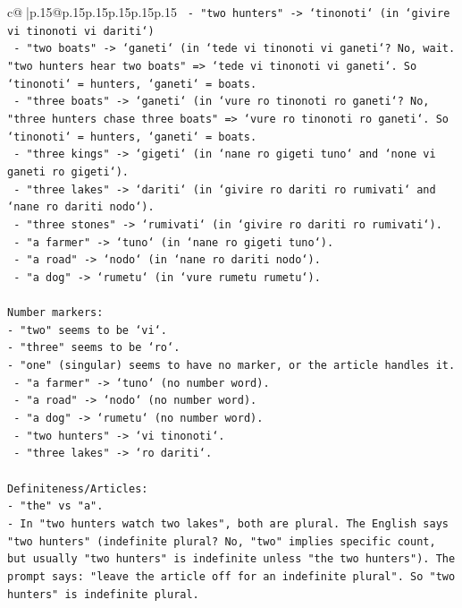 \documentclass{article}
\begin{document}
{\begin{supertabular}{c@{$\;$}|p{.15\linewidth}@{}p{.15\linewidth}p{.15\linewidth}p{.15\linewidth}p{.15\linewidth}p{.15\linewidth}}
{{{\texttt{  {-} "two hunters" {-}> `tinonoti` (in `givire vi tinonoti vi dariti`)} \\
\texttt{  {-} "two boats" {-}> `ganeti` (in `tede vi tinonoti vi ganeti`? No, wait. "two hunters hear two boats" => `tede vi tinonoti vi ganeti`. So `tinonoti` = hunters, `ganeti` = boats.} \\
\texttt{  {-} "three boats" {-}> `ganeti` (in `vure ro tinonoti ro ganeti`? No, "three hunters chase three boats" => `vure ro tinonoti ro ganeti`. So `tinonoti` = hunters, `ganeti` = boats.} \\
\texttt{  {-} "three kings" {-}> `gigeti` (in `nane ro gigeti tuno` and `none vi ganeti ro gigeti`).} \\
\texttt{  {-} "three lakes" {-}> `dariti` (in `givire ro dariti ro rumivati` and `nane ro dariti nodo`).} \\
\texttt{  {-} "three stones" {-}> `rumivati` (in `givire ro dariti ro rumivati`).} \\
\texttt{  {-} "a farmer" {-}> `tuno` (in `nane ro gigeti tuno`).} \\
\texttt{  {-} "a road" {-}> `nodo` (in `nane ro dariti nodo`).} \\
\texttt{  {-} "a dog" {-}> `rumetu` (in `vure rumetu rumetu`).} \\
\\ 
\texttt{Number markers:} \\
\texttt{{-} "two" seems to be `vi`.} \\
\texttt{{-} "three" seems to be `ro`.} \\
\texttt{{-} "one" (singular) seems to have no marker, or the article handles it.} \\
\texttt{  {-} "a farmer" {-}> `tuno` (no number word).} \\
\texttt{  {-} "a road" {-}> `nodo` (no number word).} \\
\texttt{  {-} "a dog" {-}> `rumetu` (no number word).} \\
\texttt{  {-} "two hunters" {-}> `vi tinonoti`.} \\
\texttt{  {-} "three lakes" {-}> `ro dariti`.} \\
\\ 
\texttt{Definiteness/Articles:} \\
\texttt{{-} "the" vs "a".} \\
\texttt{{-} In "two hunters watch two lakes", both are plural. The English says "two hunters" (indefinite plural? No, "two" implies specific count, but usually "two hunters" is indefinite unless "the two hunters"). The prompt says: "leave the article off for an indefinite plural". So "two hunters" is indefinite plural.} \\
}}}
\end{supertabular}}
\end{document}
